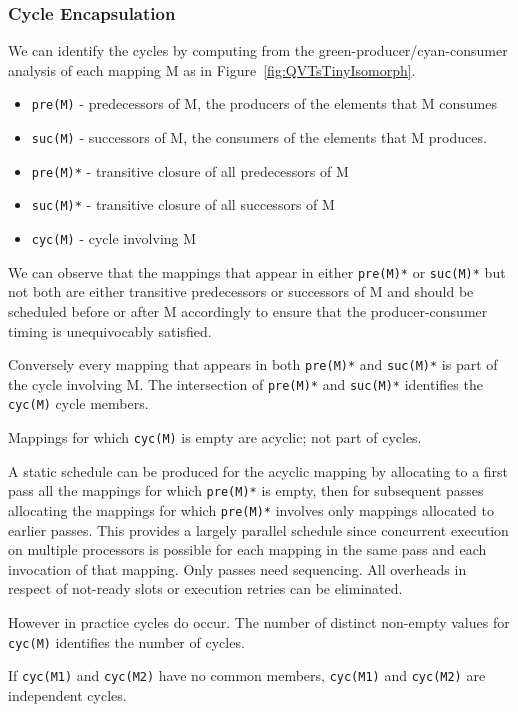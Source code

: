 \documentclass{jot}
\begin{document}
\subsubsection{Cycle Encapsulation}

We can identify the cycles by computing from the green-producer/cyan-consumer analysis of  each mapping M as in Figure~\ref{fig:QVTsTinyIsomorph}.

\begin{itemize}
	\item \verb|pre(M)| - predecessors of M, the producers of the elements that M consumes
	\item \verb|suc(M)| - successors of M, the consumers of the elements that M produces.
	\item \verb|pre(M)*| - transitive closure of all predecessors of M
	\item \verb|suc(M)*| - transitive closure of all successors of M
	\item \verb|cyc(M)| - cycle involving M
\end{itemize}
	
We can observe that the mappings that appear in either \verb|pre(M)*| or \verb|suc(M)*| but not both are either transitive predecessors or successors of M and should be scheduled before or after M accordingly to ensure that the producer-consumer timing is unequivocably satisfied.

Conversely every mapping that appears in both \verb|pre(M)*| and \verb|suc(M)*| is part of the cycle involving M. The intersection of \verb|pre(M)*| and \verb|suc(M)*| identifies the \verb|cyc(M)| cycle members.

Mappings for which \verb|cyc(M)| is empty are acyclic; not part of cycles.

A static schedule can be produced for the acyclic mapping by allocating to a first pass all the mappings for which \verb|pre(M)*| is empty, then for subsequent passes allocating  the mappings for which \verb|pre(M)*| involves only mappings allocated to earlier passes. This provides a largely parallel schedule since concurrent execution on multiple processors is possible for each mapping in the same pass and each invocation of that mapping. Only passes need sequencing. All overheads in respect of not-ready slots or execution retries can be eliminated.

However in practice cycles do occur. The number of distinct non-empty values for \verb|cyc(M)| identifies the number of cycles.

If \verb|cyc(M1)| and \verb|cyc(M2)| have no common members, \verb|cyc(M1)| and \verb|cyc(M2)| are independent cycles.
\end{document}
